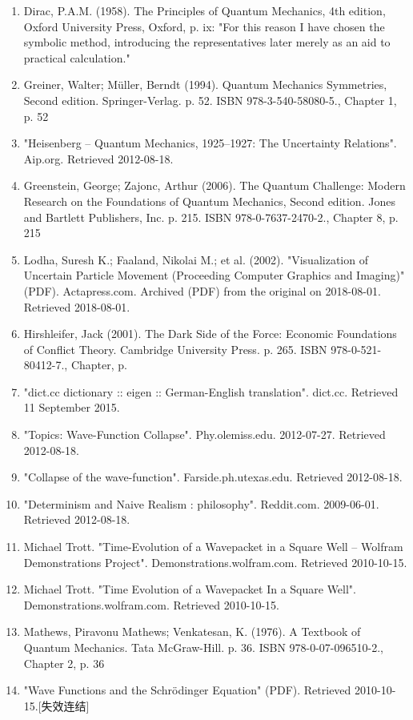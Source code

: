 \begin{enumerate}
\item Dirac, P.A.M. (1958). The Principles of Quantum Mechanics, 4th edition, Oxford University Press, Oxford, p. ix: "For this reason I have chosen the symbolic method, introducing the representatives later merely as an aid to practical calculation."
\item Greiner, Walter; Müller, Berndt (1994). Quantum Mechanics Symmetries, Second edition. Springer-Verlag. p. 52. ISBN 978-3-540-58080-5., Chapter 1, p. 52
\item "Heisenberg – Quantum Mechanics, 1925–1927: The Uncertainty Relations". Aip.org. Retrieved 2012-08-18.
\item Greenstein, George; Zajonc, Arthur (2006). The Quantum Challenge: Modern Research on the Foundations of Quantum Mechanics, Second edition. Jones and Bartlett Publishers, Inc. p. 215. ISBN 978-0-7637-2470-2., Chapter 8, p. 215
\item Lodha, Suresh K.; Faaland, Nikolai M.; et al. (2002). "Visualization of Uncertain Particle Movement (Proceeding Computer Graphics and Imaging)" (PDF). Actapress.com. Archived (PDF) from the original on 2018-08-01. Retrieved 2018-08-01.
\item Hirshleifer, Jack (2001). The Dark Side of the Force: Economic Foundations of Conflict Theory. Cambridge University Press. p. 265. ISBN 978-0-521-80412-7., Chapter, p.
\item "dict.cc dictionary :: eigen :: German-English translation". dict.cc. Retrieved 11 September 2015.
\item "Topics: Wave-Function Collapse". Phy.olemiss.edu. 2012-07-27. Retrieved 2012-08-18.
\item "Collapse of the wave-function". Farside.ph.utexas.edu. Retrieved 2012-08-18.
\item "Determinism and Naive Realism : philosophy". Reddit.com. 2009-06-01. Retrieved 2012-08-18.
\item Michael Trott. "Time-Evolution of a Wavepacket in a Square Well – Wolfram Demonstrations Project". Demonstrations.wolfram.com. Retrieved 2010-10-15.
\item Michael Trott. "Time Evolution of a Wavepacket In a Square Well". Demonstrations.wolfram.com. Retrieved 2010-10-15.
\item Mathews, Piravonu Mathews; Venkatesan, K. (1976). A Textbook of Quantum Mechanics. Tata McGraw-Hill. p. 36. ISBN 978-0-07-096510-2., Chapter 2, p. 36
\item "Wave Functions and the Schrödinger Equation" (PDF). Retrieved 2010-10-15.[失效连结]

\end{enumerate}
